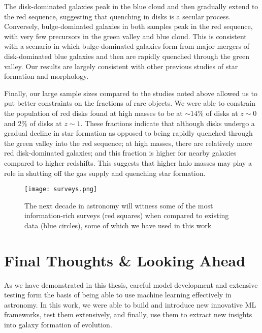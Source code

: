 The disk-dominated galaxies peak in the blue cloud and then gradually extend to the red sequence, suggesting that quenching in disks is a secular process. Conversely, bulge-dominated galaxies in both samples peak  in  the  red  sequence,  with  very few precursors in the green valley and blue cloud. This is consistent with a scenario in which bulge-dominated galaxies form from major mergers of disk-dominated blue galaxies and then are rapidly quenched through the green valley. Our results are largely consistent with other previous studies of star formation and morphology.

Finally, our large sample sizes compared to the studies noted above allowed us to put better constraints on the fractions of rare objects. We were able to constrain the population of red disks found at high masses to be at $\sim14$\% of disks at $z\sim0$ and 2\% of disks at $z \sim 1$. These fractions indicate that although disks undergo a gradual decline in star formation as opposed to being rapidly quenched through the green valley into the red sequence; at high masses, there are relatively more red disk-dominated galaxies; and this fraction is higher for nearby galaxies compared to higher redshifts. This suggests that higher halo masses may play a role in shutting off the gas supply and quenching star formation. 

\begin{wrapfigure}{R}{0.45\textwidth}
\centering
\vspace{-0.3in}
\texttt{[image: surveys.png]}
\vspace{-0.3in}
\caption{ The next decade in astronomy will witness some of the most information-rich surveys (red squares) when compared to existing data (blue circles), some of which we have used in this work}
\label{fig:surveys}
\vspace{-0.2in}
\end{wrapfigure}


\section{Final Thoughts \& Looking Ahead} \label{sec_conc:future}
As we have demonstrated in this thesis, careful model development and extensive testing form the basis of being able to use machine learning effectively in astronomy. In this work, we were able to build and introduce new innovative ML frameworks, test them extensively, and finally, use them to extract new insights into galaxy formation of evolution.

